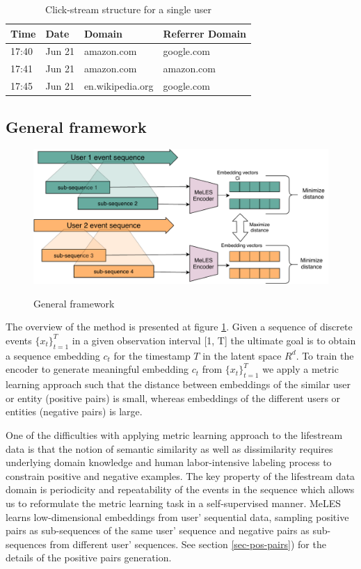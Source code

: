 \documentclass[sigconf, anonymous]{acmart}
\begin{document}
\begin{table}[ht]
\caption{Click-stream structure for a single user}
\begin{tabular}{ | m{2em} m{3em} m{7em} m{10em} | }
\hline
\textbf{Time} & \textbf{Date} & \textbf{Domain} & \textbf{Referrer Domain} \\
\hline
17:40 & Jun 21 & amazon.com & google.com \\
17:41 & Jun 21 & amazon.com & amazon.com \\
17:45 & Jun 21 & en.wikipedia.org & google.com \\
\hline
\end{tabular}
\label{tab-cs-data}
\end{table}

\subsection{General framework}

\begin{figure}[ht]
  \caption{General framework}
  \includegraphics[scale=0.9]{figures/arch-v2.pdf}
  \label{fig-arch}
\end{figure}

The overview of the method is presented at figure \ref{fig-arch}. Given a sequence of discrete events $\{x_t \}^T_{t=1}$ in a given observation interval [1, T] the ultimate goal is to obtain a sequence embedding $c_t$ for the timestamp $T$ in the latent space $R^d$. To train the encoder to generate meaningful embedding $c_t$ from $\{x_t \}^T_{t=1}$ we apply a metric learning approach such that the distance between embeddings of the similar user or entity (positive pairs) is small, whereas embeddings of the different users or entities (negative pairs) is large.

One of the difficulties with applying metric learning approach to the lifestream data is that the notion of semantic similarity as well as dissimilarity requires underlying domain knowledge and human labor-intensive labeling process to constrain positive and negative examples. 
The key property of the lifestream data domain is periodicity and repeatability of the events in the sequence which allows us to reformulate the metric learning task in a self-supervised manner. MeLES learns low-dimensional embeddings from user' sequential data, sampling positive pairs as sub-sequences of the same user' sequence and negative pairs as sub-sequences from different user' sequences. See section \ref{sec-pos-pairs}) for the details of the positive pairs generation.
\end{document}
